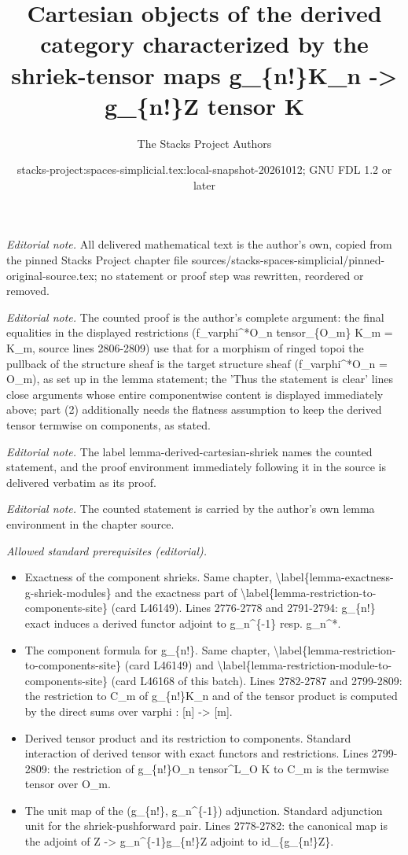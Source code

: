 \documentclass{stacks-project}
\title{Cartesian objects of the derived category characterized by the shriek-tensor maps g\_\{n!\}K\_n -> g\_\{n!\}Z tensor K}
\author{The Stacks Project Authors}
\date{stacks-project:spaces-simplicial.tex:local-snapshot-20261012; GNU FDL 1.2 or later}
\theoremstyle{plain}
\theoremstyle{definition}
\theoremstyle{remark}
\numberwithin{equation}{subsection}
\begin{document}
\maketitle
\noindent\textit{Editorial note.} All delivered mathematical text is the author's own, copied from the pinned Stacks Project chapter file sources/stacks-spaces-simplicial/pinned-original-source.tex; no statement or proof step was rewritten, reordered or removed.\par\medskip
\noindent\textit{Editorial note.} The counted proof is the author's complete argument: the final equalities in the displayed restrictions (f\_varphi\textasciicircum{}*O\_n tensor\_\{O\_m\} K\_m = K\_m, source lines 2806-2809) use that for a morphism of ringed topoi the pullback of the structure sheaf is the target structure sheaf (f\_varphi\textasciicircum{}*O\_n = O\_m), as set up in the lemma statement; the 'Thus the statement is clear' lines close arguments whose entire componentwise content is displayed immediately above; part (2) additionally needs the flatness assumption to keep the derived tensor termwise on components, as stated.\par\medskip
\noindent\textit{Editorial note.} The label lemma-derived-cartesian-shriek names the counted statement, and the proof environment immediately following it in the source is delivered verbatim as its proof.\par\medskip
\noindent\textit{Editorial note.} The counted statement is carried by the author's own lemma environment in the chapter source.\par\medskip
\noindent\textit{Allowed standard prerequisites (editorial).}\begin{itemize}
\item Exactness of the component shrieks. Same chapter, \textbackslash{}label\{lemma-exactness-g-shriek-modules\} and the exactness part of \textbackslash{}label\{lemma-restriction-to-components-site\} (card L46149). Lines 2776-2778 and 2791-2794: g\_\{n!\} exact induces a derived functor adjoint to g\_n\textasciicircum{}\{-1\} resp. g\_n\textasciicircum{}*.
\item The component formula for g\_\{n!\}. Same chapter, \textbackslash{}label\{lemma-restriction-to-components-site\} (card L46149) and \textbackslash{}label\{lemma-restriction-module-to-components-site\} (card L46168 of this batch). Lines 2782-2787 and 2799-2809: the restriction to C\_m of g\_\{n!\}K\_n and of the tensor product is computed by the direct sums over varphi : [n] -> [m].
\item Derived tensor product and its restriction to components. Standard interaction of derived tensor with exact functors and restrictions. Lines 2799-2809: the restriction of g\_\{n!\}O\_n tensor\textasciicircum{}L\_O K to C\_m is the termwise tensor over O\_m.
\item The unit map of the (g\_\{n!\}, g\_n\textasciicircum{}\{-1\}) adjunction. Standard adjunction unit for the shriek-pushforward pair. Lines 2778-2782: the canonical map is the adjoint of Z -> g\_n\textasciicircum{}\{-1\}g\_\{n!\}Z adjoint to id\_\{g\_\{n!\}Z\}.
\end{itemize}\medskip
\end{document}
